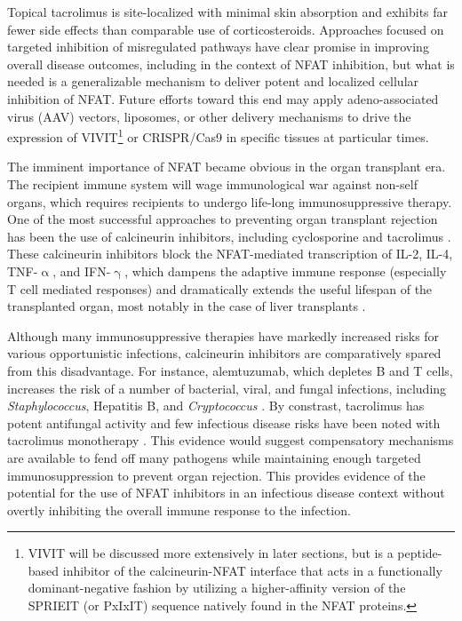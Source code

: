 Topical tacrolimus is site\hyp{}localized with minimal skin absorption and exhibits far fewer side effects than comparable use of corticosteroids. Approaches focused on targeted inhibition of misregulated pathways have clear promise in improving overall disease outcomes, including in the context of NFAT inhibition, but what is needed is a generalizable mechanism to deliver potent and localized cellular inhibition of NFAT. Future efforts toward this end may apply adeno\hyp{}associated virus (AAV) vectors, liposomes, or other delivery mechanisms to drive the expression of VIVIT\footnote{VIVIT will be discussed more extensively in later sections, but is a peptide\hyp{}based inhibitor of the calcineurin\hyp{}NFAT interface that acts in a functionally dominant\hyp{}negative fashion by utilizing a higher\hyp{}affinity version of the SPRIEIT (or PxIxIT) sequence natively found in the NFAT proteins.} or CRISPR/Cas9 in specific tissues at particular times.

The imminent importance of NFAT became obvious in the organ transplant era. The recipient immune system will wage immunological war against non\hyp{}self organs, which requires recipients to undergo life\hyp{}long immunosuppressive therapy. One of the most successful approaches to preventing organ transplant rejection has been the use of calcineurin inhibitors, including cyclosporine and tacrolimus \citep{Ellis1995, Scott2003, Mihatsch1998, Lerut2008}. These calcineurin inhibitors block the NFAT\hyp{}mediated transcription of IL\hyp{}2, IL\hyp{}4, TNF\hyp{}$\upalpha$, and IFN\hyp{}$\upgamma$, which dampens the adaptive immune response (especially T cell mediated responses) and dramatically extends the useful lifespan of the transplanted organ, most notably in the case of liver transplants \citep{McCaffrey1993, Moench2007}. 

Although many immunosuppressive therapies have markedly increased risks for various opportunistic infections, calcineurin inhibitors are comparatively spared from this disadvantage. For instance, alemtuzumab, which depletes B and T cells, increases the risk of a number of bacterial, viral, and fungal infections, including \textit{Staphylococcus}, Hepatitis B, and \textit{Cryptococcus} \citep{Harris2021, Fishman2007}. By constrast, tacrolimus has potent antifungal activity and few infectious disease risks have been noted with tacrolimus monotherapy \citep{Singh2016b, Gong2021, Papon2021, McAlister2006, Emal2019}. This evidence would suggest compensatory mechanisms are available to fend off many pathogens while maintaining enough targeted immunosuppression to prevent organ rejection. This provides evidence of the potential for the use of NFAT inhibitors in an infectious disease context without overtly inhibiting the overall immune response to the infection. 

